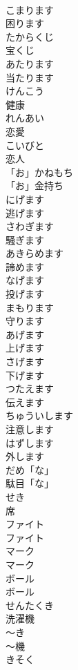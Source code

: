 \documentclass[8pt]{extreport}
\begin{document}
\begin{CJK}{UTF8}{min}
\\	こまります	
\\	困ります		
\\	たからくじ	
\\	宝くじ		
\\	あたります	
\\	当たります		
\\	けんこう	
\\	健康		
\\	れんあい	
\\	恋愛		
\\	こいびと	
\\	恋人		
\\	「お」かねもち	
\\	「お」金持ち		
\\	にげます	
\\	逃げます	
\\	さわぎます	
\\	騒ぎます		
\\	あきらめます	
\\	諦めます	
\\	なげます	
\\	投げます	
\\	まもります	
\\	守ります		
\\	あげます	
\\	上げます		
\\	さげます	
\\	下げます		
\\	つたえます	
\\	伝えます		
\\	ちゅういします	
\\	注意します	
\\	はずします	
\\	外します		
\\	だめ「な」	
\\	駄目「な」	
\\	せき	
\\	席		
\\	ファイト	
\\	ファイト		
\\	マーク	
\\	マーク		
\\	ボール	
\\	ボール		
\\	せんたくき	
\\	洗濯機		
\\	〜き	
\\	〜機		
\\	きそく	

\end{CJK}
\end{document}
